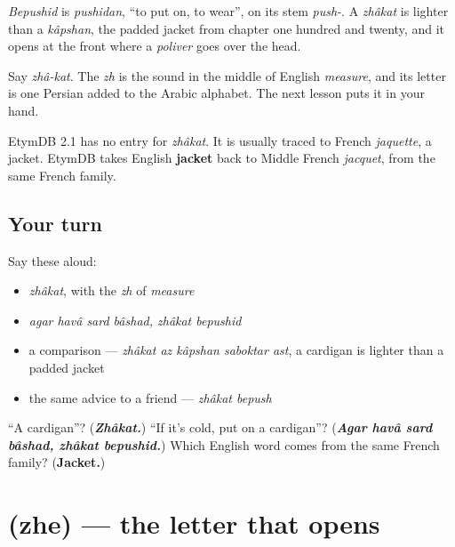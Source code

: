 \emph{Bepushid} is \emph{pushidan}, \textquotedblleft{}to put on, to wear\textquotedblright{}, on its stem \emph{push-}. A \emph{zhâkat} is lighter than a \emph{kâpshan}, the padded jacket from chapter one hundred and twenty, and it opens at the front where a \emph{poliver} goes over the head.

Say \emph{zhâ-kat}. The \emph{zh} is the sound in the middle of English \emph{measure}, and its letter is one Persian added to the Arabic alphabet. The next lesson puts it in your hand.

\begin{cousinweb}
EtymDB 2.1 has no entry for \emph{zhâkat}. It is usually traced to French \emph{jaquette}, a jacket. EtymDB takes English \textbf{jacket} back to Middle French \emph{jacquet}, from the same French family.
\end{cousinweb}

\subsection*{Your turn}
Say these aloud:

\begin{itemize}
\raggedright
  \item \emph{zhâkat}, with the \emph{zh} of \emph{measure}
  \item \emph{agar havâ sard bâshad, zhâkat bepushid}
  \item a comparison — \emph{zhâkat az kâpshan saboktar ast}, a cardigan is lighter than a padded jacket
  \item the same advice to a friend — \emph{zhâkat bepush}
\end{itemize}

\begin{tcolorbox}[breakable,colback=teal!4,colframe=teal!35!black,title={Before you move on}]
\textquotedblleft{}A cardigan\textquotedblright{}? (\emph{\textbf{Zhâkat.}}) \textquotedblleft{}If it's cold, put on a cardigan\textquotedblright{}? (\emph{\textbf{Agar havâ sard bâshad, zhâkat bepushid.}}) Which English word comes from the same French family? (\textbf{Jacket.})
\end{tcolorbox}
\section[\texorpdfstring{\fa{ژ} (zhe)}{ژ (zhe)}]{ (zhe) — the letter that opens }

\label{lesson:FA-W298-zhe}



